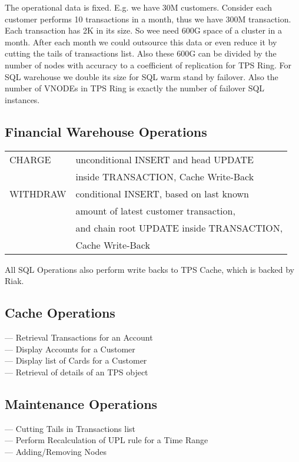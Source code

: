 The operational data is fixed. E.g. we have 30M customers.
Consider each customer performs 10 transactions in a month,
thus we have 300M transaction. Each transaction has 2K in its size.
So wee need 600G space of a cluster in a month.
After each month we could outsource this data or even reduce it
by cutting the tails of transactions list. Also these 600G can be divided
by the number of nodes with accuracy to a coefficient of replication for TPS Ring.
For SQL warehouse we double its size for SQL warm stand by failover.
Also the number of VNODEs in TPS Ring is exactly the number of failover SQL instances.

\subsection{Financial Warehouse Operations}

\begin{tabular}{ll}
CHARGE   & unconditional INSERT and head UPDATE \\
         & inside TRANSACTION, Cache Write-Back\\
WITHDRAW & conditional INSERT, based on last known \\
         & amount of latest customer transaction,\\
         & and chain root UPDATE inside TRANSACTION,\\
         & Cache Write-Back\\
\end{tabular}

All SQL Operations also perform write backs to TPS Cache, which is backed by Riak.

\subsection{Cache Operations}

— Retrieval Transactions for an Account\\ %
— Display Accounts for a Customer\\
— Display list of Cards for a Customer\\
— Retrieval of details of an TPS object\\

\subsection{Maintenance Operations}

— Cutting Tails in Transactions list \\ %
— Perform Recalculation of UPL rule for a Time Range \\
— Adding/Removing Nodes \\

